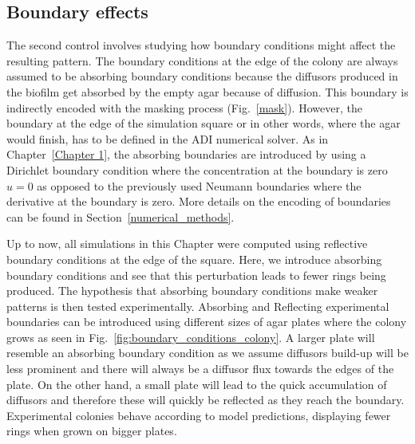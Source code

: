 \subsection{Boundary effects}
The second control involves studying how boundary conditions might affect the resulting pattern.
The boundary conditions at the edge of the colony are always assumed to be absorbing boundary conditions because the diffusors produced in the biofilm get absorbed by the empty agar because of diffusion.
This boundary is indirectly encoded with the masking process (Fig.~\ref{mask}).
However, the boundary at the edge of the simulation square or in other words, where the agar would finish, has to be defined in the ADI numerical solver.
As in Chapter~\ref{Chapter 1}, the absorbing boundaries are introduced by using a Dirichlet boundary condition where the concentration at the boundary is zero $u=0$ as opposed to the previously used Neumann boundaries where the derivative at the boundary is zero.
More details on the encoding of boundaries can be found in Section~\ref{numerical_methods}.

Up to now, all simulations in this Chapter were computed using reflective boundary conditions at the edge of the square.
Here, we introduce absorbing boundary conditions and see that this perturbation leads to fewer rings being produced.
The hypothesis that absorbing boundary conditions make weaker patterns is then tested experimentally.
Absorbing and Reflecting experimental boundaries can be introduced using different sizes of agar plates where the colony grows as seen in Fig.~\ref{fig:boundary_conditions_colony}.
A larger plate will resemble an absorbing boundary condition as we assume diffusors build-up will be less prominent and there will always be a diffusor flux towards the edges of the plate.
On the other hand, a small plate will lead to the quick accumulation of diffusors and therefore these will quickly be reflected as they reach the boundary.
Experimental colonies behave according to model predictions, displaying fewer rings when grown on bigger plates.


